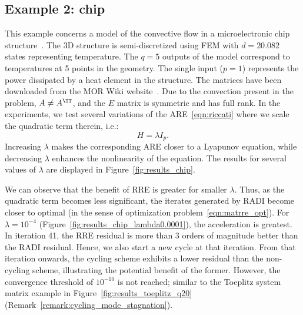 \subsection{Example 2: chip}\label{sct:chip}
This example concerns a model of the convective flow in a microelectronic chip structure~\cite{morMooRGetal04}.
The 3D structure is semi-discretized using \ac{FEM} with $d = \num{20,082}$ states representing temperature.
The $q = 5$ outputs of the model correspond to temperatures at 5 points in the geometry.
The single input ($p = 1$) represents the power dissipated by a heat element in the structure.
The matrices have been downloaded from the MOR Wiki website~\cite{morwiki_convection}.
Due to the convection present in the problem, $A \neq A^\TT$, and the $E$ matrix is symmetric and has full rank.
In the experiments, we test several variations of the \ac{ARE}~\eqref{eqn:riccati} where we scale the quadratic term therein, i.e.:
\begin{equation}
	H = \lambda I_p.
\end{equation}
Increasing $\lambda$ makes the corresponding \ac{ARE} closer to a Lyapunov equation, while decreasing $\lambda$ enhances the nonlinearity of the equation.
The results for several values of $\lambda$ are displayed in Figure~\ref{fig:results_chip}.

We can observe that the benefit of \ac{RRE} is greater for smaller $\lambda$.
Thus, as the quadratic term becomes less significant, the iterates generated by RADI become closer to optimal (in the sense of optimization problem~\eqref{eqn:matrre_opt}).
For $\lambda = 10^{-4}$ (Figure~\ref{fig:results_chip_lambda0.0001}), the acceleration is greatest.
In iteration 41, the \ac{RRE} residual is more than 3 orders of magnitude better than the RADI residual.
Hence, we also start a new cycle at that iteration.
From that iteration onwards, the cycling scheme exhibits a lower residual than the non-cycling scheme, illustrating the potential benefit of the former.
However, the convergence threshold of $10^{-10}$ is not reached; similar to the Toeplitz system matrix example in Figure~\ref{fig:results_toeplitz_q20} (Remark~\ref{remark:cycling_mode_stagnation}).


